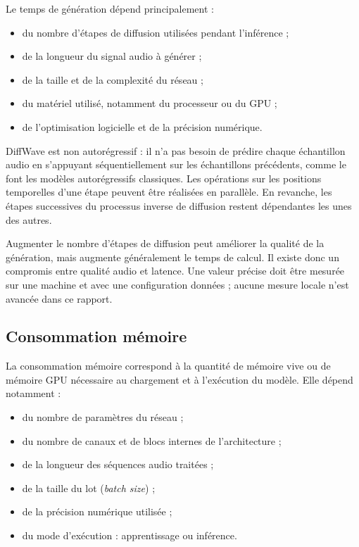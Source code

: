 Le temps de génération dépend principalement :
\begin{itemize}
    \item du nombre d'étapes de diffusion utilisées pendant l'inférence ;
    \item de la longueur du signal audio à générer ;
    \item de la taille et de la complexité du réseau ;
    \item du matériel utilisé, notamment du processeur ou du GPU ;
    \item de l'optimisation logicielle et de la précision numérique.
\end{itemize}

DiffWave est non autorégressif : il n'a pas besoin de prédire chaque échantillon audio en s'appuyant séquentiellement sur les échantillons précédents, comme le font les modèles autorégressifs classiques. Les opérations sur les positions temporelles d'une étape peuvent être réalisées en parallèle. En revanche, les étapes successives du processus inverse de diffusion restent dépendantes les unes des autres.

Augmenter le nombre d'étapes de diffusion peut améliorer la qualité de la génération, mais augmente généralement le temps de calcul. Il existe donc un compromis entre qualité audio et latence. Une valeur précise doit être mesurée sur une machine et avec une configuration données ; aucune mesure locale n'est avancée dans ce rapport.

\subsection{Consommation mémoire}

La consommation mémoire correspond à la quantité de mémoire vive ou de mémoire GPU nécessaire au chargement et à l'exécution du modèle. Elle dépend notamment :
\begin{itemize}
    \item du nombre de paramètres du réseau ;
    \item du nombre de canaux et de blocs internes de l'architecture ;
    \item de la longueur des séquences audio traitées ;
    \item de la taille du lot (\textit{batch size}) ;
    \item de la précision numérique utilisée ;
    \item du mode d'exécution : apprentissage ou inférence.
\end{itemize}

